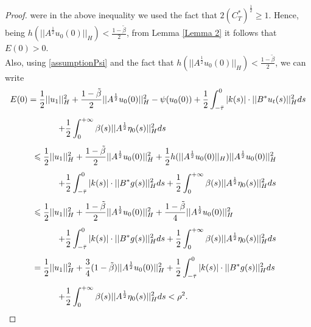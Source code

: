 \documentclass[11pt]{article}
\renewcommand{\geq}{\geqslant}
\renewcommand{\leq}{\leqslant}
\begin{document}
\begin{proof}
were in the above inequality we used the fact that $2(C_T^*)^{\frac{1}{2}}\geq 1$. Hence, being $h(||A^{\frac{1}{2}}u_0(0)||_{H})< \frac{1-\tilde{\beta}}{2} $, from Lemma \ref{Lemma 2} it follows that $E(0)>0$. 
\\Also, using \eqref{assumptionPsi} and the fact that $h(||A^{\frac{1}{2}}u_0(0)||_{H})< \frac{1-\tilde{\beta}}{2} $, we can write
$$\begin{array}{l}
	\vspace{0.3cm}\displaystyle{E(0)=\frac{1}{2}||u_1||_H^2+\frac{1-\tilde{\beta}}{2}||A^\frac{1}{2}u_0(0)||_H^2-\psi(u_0(0))+\frac{1}{2}\int_{-\bar\tau}^0 |k(s)|\cdot ||B^*u_t(s)||^2_H ds}\\
	\vspace{0.3cm}\displaystyle{\hspace{2cm}+\frac{1}{2}\int_0^{+\infty} \beta(s)||A^\frac{1}{2}\eta_0(s)||_H^2 ds}\\
	\vspace{0.3cm}\displaystyle{\hspace{1cm}\leq\frac{1}{2}||u_1||_H^2+\frac{1-\tilde{\beta}}{2}||A^\frac{1}{2}u_0(0)||_H^2+\frac{1}{2}h(||A^\frac{1}{2}u_0(0)||_H)||A^\frac{1}{2}u_0(0)||^2_H}\\ \vspace{0.3cm}\displaystyle{\hspace{2cm}+\frac{1}{2}\int_{-\bar\tau}^0 |k(s)|\cdot ||B^*g(s)||^2_H ds+\frac{1}{2}\int_0^{+\infty} \beta(s)||A^\frac{1}{2}\eta_0(s)||_H^2 ds}\\
	\vspace{0.3cm}\displaystyle{\hspace{1cm}\leq\frac{1}{2}||u_1||_H^2+\frac{1-\tilde{\beta}}{2}||A^\frac{1}{2}u_0(0)||_H^2+\frac{1-\tilde{\beta}}{4}||A^\frac{1}{2}u_0(0)||^2_H}\\ \vspace{0.3cm}\displaystyle{\hspace{2cm}+\frac{1}{2}\int_{-\bar\tau}^0 |k(s)|\cdot ||B^*g(s)||^2_H ds+\frac{1}{2}\int_0^{+\infty} \beta(s)||A^\frac{1}{2}\eta_0(s)||_H^2 ds}\\
	\vspace{0.3cm}\displaystyle{\hspace{1cm}=\frac{1}{2}||u_1||_H^2+\frac{3}{4}(1-\tilde{\beta})||A^\frac{1}{2}u_0(0)||_H^2+\frac{1}{2}\int_{-\bar\tau}^0 |k(s)|\cdot ||B^*g(s)||^2_H ds}\\ \displaystyle{\hspace{2cm}+\frac{1}{2}\int_0^{+\infty} \beta(s)||A^\frac{1}{2}\eta_0(s)||_H^2 ds< \rho^2.}
\end{array} 
$$
\end{proof}
\end{document}
